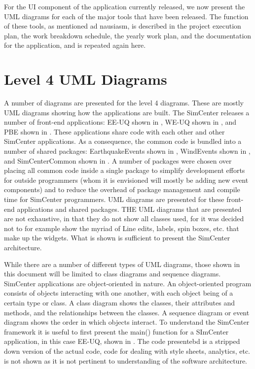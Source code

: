  
For the UI component of the application currently released, we now present the UML diagrams for each of the major tools that have been released. The function of these tools, as mentioned ad nausiasm, is described in the project execution plan, the work breakdown schedule, the yearly work plan, and the documentation for the application, and is repeated again here.

\section{Level 4 UML Diagrams}

A number of diagrams are presented for the level 4 diagrams. These are mostly UML diagrams showing how the applications are built. The SimCenter releases a number of front-end applications: EE-UQ shown in , WE-UQ shown in , and PBE shown in . These applications share code with each other and other SimCenter applications. As a consequence, the common code is bundled into a number of shared packages: EarthquakeEvents shown in , WindEvents shown in , and SimCenterCommon shown in . A number of packages were chosen over placing all common code inside a single package to simplify development efforts for outside programmers (whom it is envisioned will mostly be adding new event components) and to reduce the overhead of package management and compile time for SimCenter programmers. UML diagrams are  presented for these front-end applications and shared packages. THE UML diagrams that are presented are not exhaustive, in that they do not show all classes used, for it was decided not to for example show the myriad of Line edits, labels, spin boxes, etc. that make up the widgets. What is shown is sufficient to present the SimCenter architecture.

While there are a number of different types of UML diagrams,  those shown in this document will be limited to class diagrams and sequence diagrams. SimCenter applications are object-oriented in nature. An object-oriented program consists of objects interacting with one another,  with each object being of a certain type or class. A class diagram shows the classes, their attributes and methods, and the relationships between the classes. A sequence diagram or event diagram shows the order in which objects interact. To understand the SimCenter framework it is useful to first present the main() function for a SImCenter application, in this case EE-UQ, shown in . The code presentebd is a stripped down version of the actual code, code for dealing with style sheets, analytics, etc. is not shown as it is not pertinent to understanding of the software architecture.


